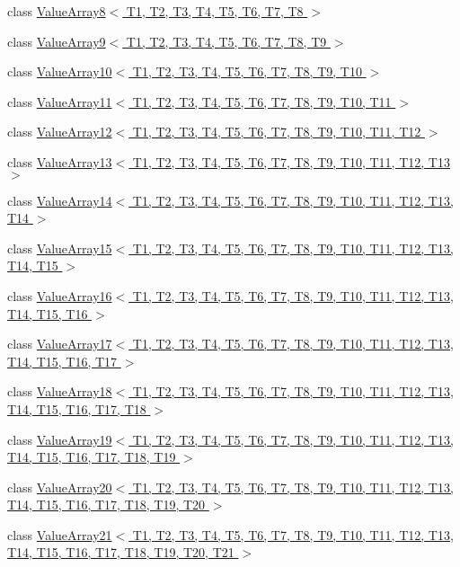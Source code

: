 \begin{DoxyCompactItemize}
\item 
class \hyperlink{classtesting_1_1internal_1_1ValueArray8}{\-Value\-Array8$<$ T1, T2, T3, T4, T5, T6, T7, T8 $>$}
\item 
class \hyperlink{classtesting_1_1internal_1_1ValueArray9}{\-Value\-Array9$<$ T1, T2, T3, T4, T5, T6, T7, T8, T9 $>$}
\item 
class \hyperlink{classtesting_1_1internal_1_1ValueArray10}{\-Value\-Array10$<$ T1, T2, T3, T4, T5, T6, T7, T8, T9, T10 $>$}
\item 
class \hyperlink{classtesting_1_1internal_1_1ValueArray11}{\-Value\-Array11$<$ T1, T2, T3, T4, T5, T6, T7, T8, T9, T10, T11 $>$}
\item 
class \hyperlink{classtesting_1_1internal_1_1ValueArray12}{\-Value\-Array12$<$ T1, T2, T3, T4, T5, T6, T7, T8, T9, T10, T11, T12 $>$}
\item 
class \hyperlink{classtesting_1_1internal_1_1ValueArray13}{\-Value\-Array13$<$ T1, T2, T3, T4, T5, T6, T7, T8, T9, T10, T11, T12, T13 $>$}
\item 
class \hyperlink{classtesting_1_1internal_1_1ValueArray14}{\-Value\-Array14$<$ T1, T2, T3, T4, T5, T6, T7, T8, T9, T10, T11, T12, T13, T14 $>$}
\item 
class \hyperlink{classtesting_1_1internal_1_1ValueArray15}{\-Value\-Array15$<$ T1, T2, T3, T4, T5, T6, T7, T8, T9, T10, T11, T12, T13, T14, T15 $>$}
\item 
class \hyperlink{classtesting_1_1internal_1_1ValueArray16}{\-Value\-Array16$<$ T1, T2, T3, T4, T5, T6, T7, T8, T9, T10, T11, T12, T13, T14, T15, T16 $>$}
\item 
class \hyperlink{classtesting_1_1internal_1_1ValueArray17}{\-Value\-Array17$<$ T1, T2, T3, T4, T5, T6, T7, T8, T9, T10, T11, T12, T13, T14, T15, T16, T17 $>$}
\item 
class \hyperlink{classtesting_1_1internal_1_1ValueArray18}{\-Value\-Array18$<$ T1, T2, T3, T4, T5, T6, T7, T8, T9, T10, T11, T12, T13, T14, T15, T16, T17, T18 $>$}
\item 
class \hyperlink{classtesting_1_1internal_1_1ValueArray19}{\-Value\-Array19$<$ T1, T2, T3, T4, T5, T6, T7, T8, T9, T10, T11, T12, T13, T14, T15, T16, T17, T18, T19 $>$}
\item 
class \hyperlink{classtesting_1_1internal_1_1ValueArray20}{\-Value\-Array20$<$ T1, T2, T3, T4, T5, T6, T7, T8, T9, T10, T11, T12, T13, T14, T15, T16, T17, T18, T19, T20 $>$}
\item 
class \hyperlink{classtesting_1_1internal_1_1ValueArray21}{\-Value\-Array21$<$ T1, T2, T3, T4, T5, T6, T7, T8, T9, T10, T11, T12, T13, T14, T15, T16, T17, T18, T19, T20, T21 $>$}

\end{DoxyCompactItemize}

